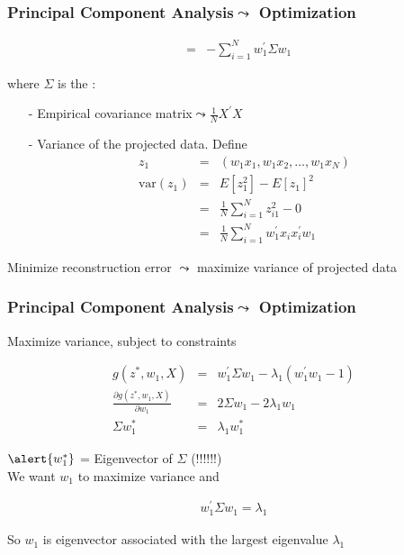 \begin{frame}[fragile]
\frametitle{Principal Component Analysis$\leadsto$ Optimization}

\begin{eqnarray}
 & = & -  \sum_{i=1}^{N} {w}_{1}^{'}{\Sigma} {w}_{1} \nonumber  
\end{eqnarray}


where ${\Sigma}$ is the :  
\begin{itemize}
\item[-] Empirical covariance matrix$\leadsto \frac{1}{N} {X}^{'}{X}$ 
\item[-] \alert{Variance} of the projected data.  Define 
\begin{eqnarray}
{z}_{1} & = & ({w}_{1} {x}_{1}, {w}_{1} {x}_{2}, \hdots, {w}_{1}{x}_{N}) \nonumber \\ 
\text{var}({z}_{1}) & = & E[{z}_{1}^{2} ]  - E[{z}_{1}]^{2} \nonumber \\  
& = & \frac{1}{N} \sum_{i=1}^{N} z_{i1}^{2} - 0 \nonumber \\
& = & \frac{1}{N} \sum_{i=1}^{N} {w}_{1}^{'}{x}_{i}{x}_{i}^{'}{w}_{1} \nonumber 
\end{eqnarray}

\end{itemize}

Minimize reconstruction error $\leadsto$ maximize variance of projected data

\end{frame}


\begin{frame}[fragile]
\frametitle{Principal Component Analysis$\leadsto$ Optimization}

Maximize variance, subject to constraints  


\begin{eqnarray}
g({z}^{*}, {w}_{1}, {X}) & = & {w}_{1}^{'} {\Sigma}{w}_{1} - \lambda_{1}({w}_{1}^{'} {w}_{1} - 1 ) \nonumber \\
 \frac{\partial g({z}^{*}, {w}_{1}, {X})}{\partial {w}_{1}} &= & 2 {\Sigma}{w}_{1}  - 2 \lambda_{1} {w}_{1} \nonumber \\
 {\Sigma}{w}_{1}^{*} & = &  \lambda_{1} {w}_{1}^{*} \nonumber
\end{eqnarray}

$\alert{{w}_{1}^{*}}$ = \alert{Eigenvector of ${\Sigma}$}  (!!!!!!)  \\

We want ${w}_{1}$ to maximize variance and 

	\begin{eqnarray}
{w}_{1}^{'} {\Sigma} {w}_{1} = \lambda_{1} \nonumber 
	\end{eqnarray}

So ${w}_{1}$ is eigenvector associated with the largest eigenvalue $\lambda_{1}$ 

\end{frame}




